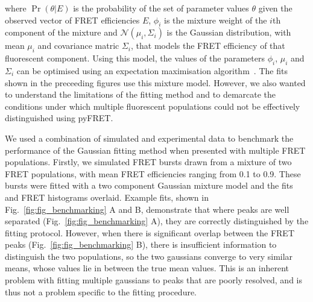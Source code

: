 where $\Pr(\theta|E)$ is the probability of the set of parameter values $\theta$ given the observed vector of FRET efficiencies $E$, $\phi_i$ is the mixture weight of the $i$th component of the mixture and $\mathcal{N}(\mu_i, \Sigma_i)$ is the Gaussian distribution, with mean $\mu_i$ and covariance matric $\Sigma_i$, that models the FRET efficiency of that fluorescent component. Using this model, the values of the parameters $\phi_i$, $\mu_i$ and $\Sigma_i$ can be optimised using an expectation maximisation algorithm~\cite{Guoshen2012}. The fits shown in the preceeding figures use this mixture model. However, we also wanted to understand the limitations of the fitting method and to demarcate the conditions under which multiple fluorescent populations could not be effectively distinguished using pyFRET. 

We used a combination of simulated and experimental data to benchmark the performance of the Gaussian fitting method when presented with multiple FRET populations. Firstly, we simulated FRET bursts drawn from a mixture of two FRET populations, with mean FRET efficiencies ranging from 0.1 to 0.9. These bursts were fitted with a two component Gaussian mixture model and the fits and FRET histograms overlaid. Example fits, shown in Fig.~\ref{fig:fig_benchmarking} A and B, demonstrate that where peaks are well separated (Fig.~\ref{fig:fig_benchmarking} A), they are correctly distinguished by the fitting protocol. However, when there is significant overlap between the FRET peaks (Fig.~\ref{fig:fig_benchmarking} B), there is insufficient information to distinguish the two populations, so the two gaussians converge to very similar means, whose values lie in between the true mean values. This is an inherent problem with fitting multiple gaussians to peaks that are poorly resolved, and is thus not a problem specific to the fitting procedure.


